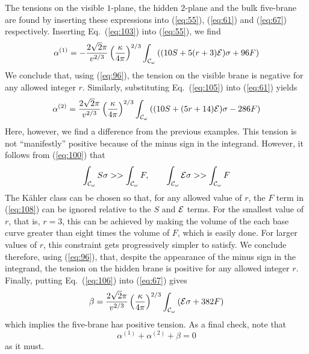 \documentclass[a4paper,12pt]{article}
\numberwithin{equation}{section}
\theoremstyle{plain}
\begin{document}
The tensions on the visible $1$-plane, the hidden $2$-plane and the bulk
five-brane are found by inserting these expressions into (\ref{eq:55}),
(\ref{eq:61}) and (\ref{eq:67}) respectively. Inserting Eq.~(\ref{eq:103}) 
into (\ref{eq:55}), we find 
%
\begin{equation}
\alpha^{(1)}=-\frac{2\sqrt{2}\pi}{v^{2/3}}\left(\frac{\kappa}{4\pi}\right)^{2/3}
\int_{{\cal{C}}_{\omega}}{((10S+5(r+3){\cal{E}})\sigma+96F)}
\label{eq:107}
\end{equation}
%
We conclude that, using (\ref{eq:96}), the tension on the visible brane is
negative for any allowed integer $r$. Similarly, substituting Eq.~(\ref{eq:105}) into (\ref{eq:61}) yields
%
\begin{equation}
\alpha^{(2)}=\frac{2\sqrt{2}\pi}{v^{2/3}}\left(\frac{\kappa}{4\pi}\right)^{2/3}
\int_{{\cal{C}}_{\omega}}{((10S+(5r+14){\cal{E}})\sigma-286F)}
\label{eq:108}
\end{equation}
%
Here, however, we find a difference from the previous examples. This tension
is not ``manifestly'' positive because of the minus sign in the integrand.
However, it follows from (\ref{eq:100}) that
%
\begin{equation}
\int_{{\cal{C}}_{\omega}}{S\sigma}>>\int_{{\cal{C}}_{\omega}}{F}, \qquad
\int_{{\cal{C}}_{\omega}}{{\cal{E}}\sigma}>>\int_{{\cal{C}}_{\omega}}{F}
\label{eq:109}
\end{equation}
%
The K\"{a}hler class can be chosen so that, for any allowed value of $r$, the
$F$ term in (\ref{eq:108}) can be ignored relative to the $S$ and ${\cal{E}}$
terms. For the smallest value of $r$, that is, $r=3$, this can be achieved by making
the volume of the each base curve greater than eight times the volume of $F$,
which is easily done. For larger values of $r$, this constraint gets
progressively simpler to satisfy. We conclude therefore, using (\ref{eq:96}), that, 
despite the appearance of the minus sign in the integrand, the tension on the
hidden brane is positive for any allowed integer $r$. Finally, putting
Eq.~(\ref{eq:106}) into (\ref{eq:67}) gives
%
\begin{equation}
\beta=\frac{2\sqrt{2}\pi}{v^{2/3}}\left(\frac{\kappa}{4\pi}\right)^{2/3}\int_
{{\cal{C}}_{\omega}}{({\cal{E}}\sigma+382F)}
\label{eq:110}
\end{equation}
%
which implies the five-brane has positive tension. As a final check, note that 
%
\begin{equation}
\alpha^{(1)}+\alpha^{(2)}+\beta=0
\label{eq:111}
\end{equation}
%
as it must.
\end{document}
